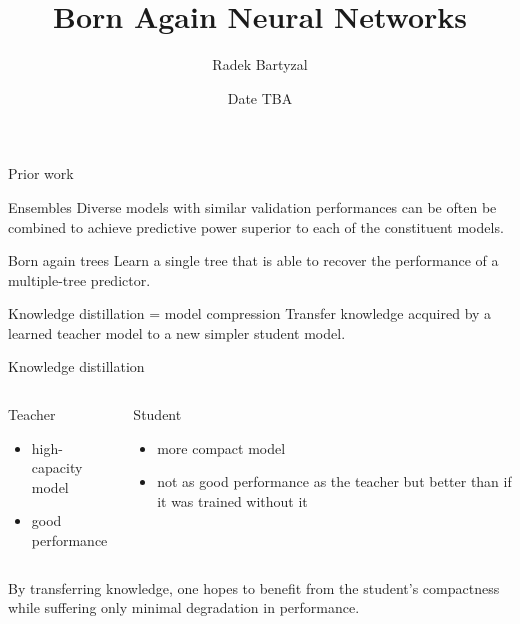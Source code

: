\documentclass{beamer}
\begin{document}
\title{Born Again Neural Networks}  
\author{Radek Bartyzal}
\date{Date TBA} 

\frame{\titlepage} 

\begin{frame}{Prior work}


\begin{block}{Ensembles}
Diverse models with similar validation performances can be often be combined to achieve predictive
power superior to each of the constituent models. \cite{cit:ensembles}
\end{block}

\begin{block}{Born again trees}
Learn a single tree that is able to recover the performance of a multiple-tree predictor. \cite{cit:bat}
\end{block}

\begin{block}{Knowledge distillation = model compression}
Transfer knowledge acquired by a learned
teacher model to a new simpler student model. \cite{cit:distill}
\end{block}



\end{frame}

\begin{frame}[t]{Knowledge distillation}

\begin{columns}[t]
\begin{column}{0.5\textwidth}
Teacher
\begin{itemize}
\item high-capacity model
\item good performance
\end{itemize}
\end{column}

\begin{column}{0.5\textwidth}
Student
\begin{itemize}
\item more compact model
\item not as good performance as the teacher but better than if it was trained without it
\end{itemize}
\end{column}

\end{columns}

\vfill
By transferring knowledge, one hopes to benefit from the student’s
compactness while suffering only minimal degradation in performance.

\end{frame}
\end{document}
